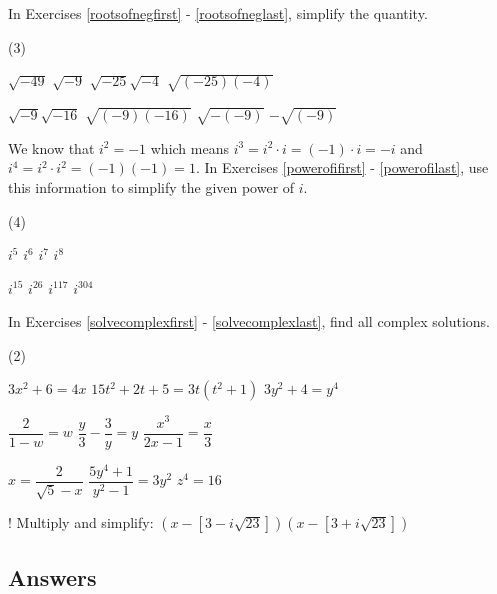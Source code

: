 In Exercises \ref{rootsofnegfirst} - \ref{rootsofneglast}, simplify the quantity.

\begin{tasks}[resume](3)

\task $\sqrt{-49}$ \label{rootsofnegfirst}
\task $\sqrt{-9}$
\task $\sqrt{-25}\sqrt{-4}$
\task $\sqrt{(-25)(-4)}$

\task $\sqrt{-9}\sqrt{-16}$
\task $\sqrt{(-9)(-16)}$
\task $\sqrt{-(-9)}$
\task $-\sqrt{(-9)}$ \label{rootsofneglast}

\end{tasks}

We know that $i^{2} = -1$ which means $i^{3} = i^{2} \cdot i = (-1) \cdot i = -i$ and $i^{4} = i^{2} \cdot i^{2} = (-1)(-1) = 1$. In Exercises \ref{powerofifirst} - \ref{powerofilast}, use this information to simplify the given power of $i$.

\begin{tasks}[resume](4)
    
\task $i^{5}$ \label{powerofifirst}
\task $i ^{6}$
\task $i^{7}$
\task $i^{8}$


\task $i^{15}$
\task $i^{26}$
\task $i^{117}$
\task $i^{304}$ \label{powerofilast}

\end{tasks}

In Exercises \ref{solvecomplexfirst} - \ref{solvecomplexlast}, find all complex solutions.

\begin{tasks}[resume](2)

\task $3x^2 + 6 = 4x$ \label{solvecomplexfirst}
\task  $15t^2+2t+5= 3t(t^2+1)$
\task  $3y^2 + 4 = y^4$

\task $\dfrac{2}{1-w}= w$ 
\task $\dfrac{y}{3} - \dfrac{3}{y} = y$ 
\task $\dfrac{x^3}{2x-1} = \dfrac{x}{3}$ 

\task  $x =\dfrac{2}{\sqrt{5} - x}$
\task  $\dfrac{5y^4 + 1}{y^2-1} = 3y^2$
\task  $z^{4} = 16$  \label{solvecomplexlast}


\task!  Multiply and simplify:  $\left(x - [3 - i\sqrt{23}]\right)\left(x - [3+i\sqrt{23}]\right)$

\end{tasks}


\clearpage

\subsection{Answers}

